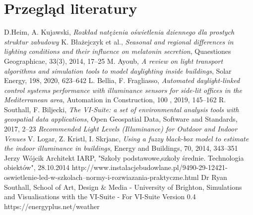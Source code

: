 \documentclass[a4paper,12pt]{article}
\begin{document}
	\section{Przegląd literatury}
	\label{sec:przeglad_literatury}
	\begin{thebibliography}{7}
		D.Heim, A. Kujawski, \textit{Rozkład natężenia oświetlenia dziennego dla prostych struktur zabudowy}
		K. Błażejczyk et al., \textit{Seasonal and regional differences in lighting conditions and their influence on melatonin secretion}, Quaestiones Geographicae, 33(3), 2014, 17--25
		M. Ayoub, \textit{A review on light transport algorithms and simulation tools to model daylighting inside buildings}, Solar Energy, 198, 2020, 623--642
		L. Bellia, F. Fragliasso, \textit{Automated daylight-linked control systems performance with illuminance sensors for side-lit offices in the Mediterranean area}, Automation in Construction, 100 , 2019, 145--162
		R. Southall, F. Biljecki, \textit{The VI-Suite: a set of environmental analysis tools with geospatial data applications}, Open Geospatial Data, Software and Standards, 2017, 2--23
		\textit{Recommended Light Levels (Illuminance) for Outdoor and Indoor Venues}
		V. Logar, Z. Kristl, I. Skrjanc, \textit{Using a fuzzy black-box model to estimate the indoor illuminance in buildings}, Energy and Buildings, 70, 2014, 343--351
		Jerzy Wójcik Architekt IARP, "Szkoły podstawowe,szkoły średnie. Technologia obiektów", 28.10.2014
		http://www.instalacjebudowlane.pl/9490-29-12421-oswietlenie-led-w-szkolach--normy-i-rozwiazania-praktyczne.html
		Dr Ryan Southall, School of Art, Design \& Media - University of Brighton, Simulations and Visualisations with the VI-Suite - For VI-Suite Version 0.4
		https://energyplus.net/weather
		
	\end{thebibliography}
	
\end{document}
